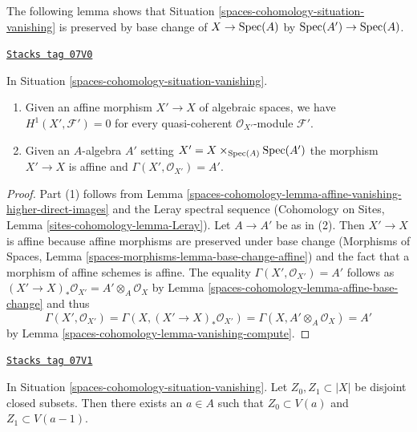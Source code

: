 The following lemma shows that Situation \ref{spaces-cohomology-situation-vanishing}
is preserved by base change of $X \to \operatorname{Spec}(A)$ by $\operatorname{Spec}(A') \to \operatorname{Spec}(A)$.

\begin{lemma}
\label{spaces-cohomology-lemma-vanishing-base-change}
\href{https://stacks.math.columbia.edu/tag/07V0}{\texttt{Stacks tag 07V0}}

In Situation \ref{spaces-cohomology-situation-vanishing}.
\begin{enumerate}
\item Given an affine morphism $X' \to X$ of algebraic spaces, we have
$H^1(X', \mathcal{F}') = 0$ for every quasi-coherent
$\mathcal{O}_{X'}$-module $\mathcal{F}'$.
\item Given an $A$-algebra $A'$ setting $X' = X \times_{\operatorname{Spec}(A)} \operatorname{Spec}(A')$
the morphism $X' \to X$ is affine and $\Gamma(X', \mathcal{O}_{X'}) = A'$.
\end{enumerate}
\end{lemma}

\begin{proof}
Part (1) follows from Lemma \ref{spaces-cohomology-lemma-affine-vanishing-higher-direct-images}
and the Leray spectral sequence (Cohomology on Sites, Lemma
\ref{sites-cohomology-lemma-Leray}). Let $A \to A'$ be as in (2).
Then $X' \to X$ is affine because affine morphisms are preserved under
base change (Morphisms of Spaces, Lemma
\ref{spaces-morphisms-lemma-base-change-affine}) and the
fact that a morphism of affine schemes is affine. The equality
$\Gamma(X', \mathcal{O}_{X'}) = A'$ follows as
$(X' \to X)_*\mathcal{O}_{X'} = A' \otimes_A \mathcal{O}_X$
by Lemma \ref{spaces-cohomology-lemma-affine-base-change} and thus
$$
\Gamma(X', \mathcal{O}_{X'}) =
\Gamma(X, (X' \to X)_*\mathcal{O}_{X'}) =
\Gamma(X, A' \otimes_A \mathcal{O}_X) = A'
$$
by Lemma \ref{spaces-cohomology-lemma-vanishing-compute}.
\end{proof}

\begin{lemma}
\label{spaces-cohomology-lemma-vanishing-separate-closed}
\href{https://stacks.math.columbia.edu/tag/07V1}{\texttt{Stacks tag 07V1}}

In Situation \ref{spaces-cohomology-situation-vanishing}. Let $Z_0, Z_1 \subset |X|$
be disjoint closed subsets. Then there exists an $a \in A$ such that
$Z_0 \subset V(a)$ and $Z_1 \subset V(a - 1)$.
\end{lemma}

